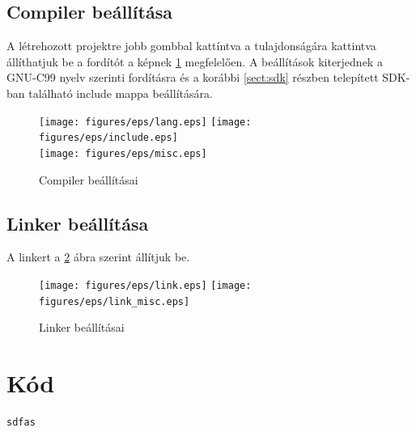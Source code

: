 \subsection{Compiler beállítása}
	A létrehozott projektre jobb gombbal kattíntva a tulajdonságára kattintva
	állíthatjuk be a fordítót a képnek \ref{fig:compiler} megfelelően.
	A beállítások kiterjednek a GNU-C99 nyelv szerinti fordításra és a korábbi
	\ref{sect:sdk} részben telepített SDK-ban található include mappa beállítására. 
	\begin{figure}[H]
	\centering
	\texttt{[image: figures/eps/lang.eps]}\hspace{1cm}
	\texttt{[image: figures/eps/include.eps]}\\\vspace{5mm}
	\texttt{[image: figures/eps/misc.eps]}
	\caption{Compiler beállításai} 
	\label{fig:compiler}
	\end{figure}

\subsection{Linker beállítása}
	A linkert a \ref{fig:linker} ábra szerint állítjuk be.
	\begin{figure}[H]
	\centering
	\texttt{[image: figures/eps/link.eps]}\hspace{1cm}
	\texttt{[image: figures/eps/link\_misc.eps]}\\\vspace{5mm}
	\caption{Linker beállításai} 
	\label{fig:linker}
	\end{figure}



\section{Kód}
\begin{lstlisting}[frame=single,float=!ht,caption=A fenti számozott felsorolás \LaTeX- forráskódja, label=listing:Example]
sdfas
\end{lstlisting}


